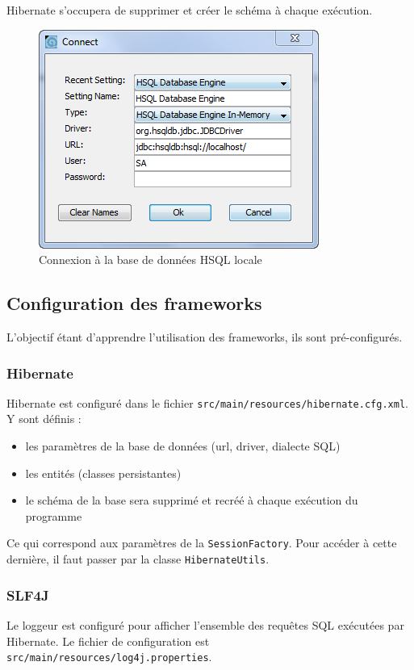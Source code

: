 \documentclass[small,algo]{dushClass} %
\begin{document}
Hibernate s'occupera de supprimer et créer le schéma à chaque exécution.

\begin{figure}[ht]\label{hsqldb-connect}
	\center
	\includegraphics{images/hsqldb_connect.png}
	\caption{Connexion à la base de données HSQL locale}
\end{figure}


\subsection{Configuration des frameworks}

L'objectif étant d'apprendre l'utilisation des frameworks, ils sont pré-configurés.

\subsubsection{Hibernate}

Hibernate est configuré dans le fichier \texttt{src/main/resources/hibernate.cfg.xml}. Y sont définis :
\begin{itemize}
\item les paramètres de la base de données (url, driver, dialecte SQL)
\item les entités (classes persistantes)
\item le schéma de la base sera supprimé et recréé à chaque exécution du programme\\
\end{itemize}

Ce qui correspond aux paramètres de la \texttt{SessionFactory}. Pour accéder à cette dernière, il faut passer par la classe \texttt{HibernateUtils}.

\subsubsection{SLF4J}
Le loggeur est configuré pour afficher l'ensemble des requêtes SQL exécutées par Hibernate. Le fichier de configuration est \texttt{src/main/resources/log4j.properties}.
\end{document}
